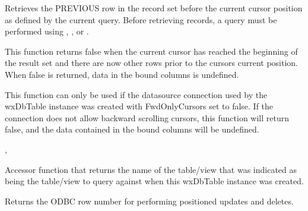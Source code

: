 

\label{wxdbtablegetprev}


Retrieves the PREVIOUS row in the record set before the current cursor
position as defined by the current query.  Before retrieving records, a
query must be performed using ,
,
 or
.


This function returns false when the current cursor has reached the beginning
of the result set and there are now other rows prior to the cursors current
position.  When false is returned, data in the bound columns is undefined.


This function can only be used if the datasource connection used by the
wxDbTable instance was created with FwdOnlyCursors set to false.  If the
connection does not allow backward scrolling cursors, this function will
return false, and the data contained in the bound columns will be undefined.


,

\label{wxdbtablegetquerytablename}


Accessor function that returns the name of the table/view that was indicated
as being the table/view to query against when this wxDbTable instance was
created.



\label{wxdbtablegetrownum}


Returns the ODBC row number for performing positioned updates and deletes.


